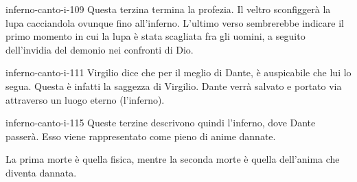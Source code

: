 \documentclass[preview]{standalone}
\begin{document}
\begin{snippet}{inferno-canto-i-109}
    Questa terzina termina la profezia.
    Il veltro sconfiggerà la lupa cacciandola ovunque fino all'inferno.
    L'ultimo verso sembrerebbe indicare il primo momento in cui la lupa è stata scagliata
    fra gli uomini, a seguito dell'invidia del demonio nei confronti di Dio.
\end{snippet}

\begin{snippet}{inferno-canto-i-111}
    Virgilio dice che per il meglio di Dante, è auspicabile che lui lo segua.
    Questa è infatti la saggezza di Virgilio.
    Dante verrà salvato e portato via attraverso un luogo eterno (l'inferno).
\end{snippet}

\begin{snippet}{inferno-canto-i-115}
    Queste terzine descrivono quindi l'inferno, dove Dante passerà.
    Esso viene rappresentato come pieno di anime dannate.
    
    La prima morte è quella fisica, mentre la seconda morte è quella dell'anima che
    diventa dannata.
\end{snippet}
\end{document}
